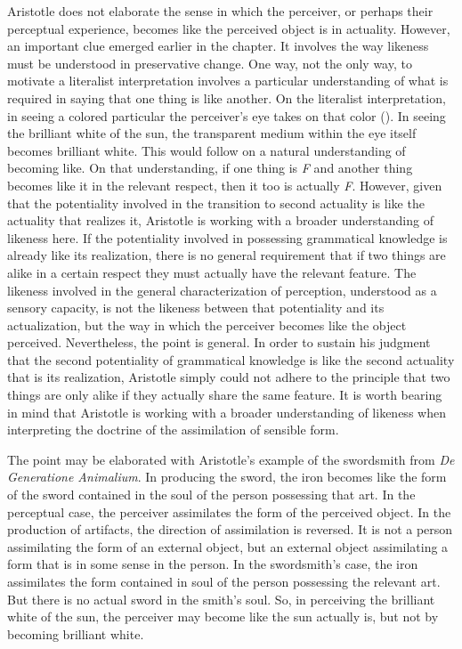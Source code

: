 Aristotle does not elaborate the sense in which the perceiver, or perhaps their perceptual experience, becomes like the perceived object is in actuality. However, an important clue emerged earlier in the chapter. It involves the way likeness must be understood in preservative change. One way, not the only way, to motivate a literalist interpretation involves a particular understanding of what is required in saying that one thing is like another. On the literalist interpretation, in seeing a colored particular the perceiver's eye takes on that color (\citealt{Slakey:1961ss,Sorabji:1974fk,Sorabji:2003fk,Everson:1997ep}). In seeing the brilliant white of the sun, the transparent medium within the eye itself becomes brilliant white. This would follow on a natural understanding of becoming like. On that understanding, if one thing is \emph{F} and another thing becomes like it in the relevant respect, then it too is actually \emph{F}. However, given that the potentiality involved in the transition to second actuality is like the actuality that realizes it, Aristotle is working with a broader understanding of likeness here. If the potentiality involved in possessing grammatical knowledge is already like its realization, there is no general requirement that if two things are alike in a certain respect they must actually have the relevant feature. The likeness involved in the general characterization of perception, understood as a sensory capacity, is not the likeness between that potentiality and its actualization, but the way in which the perceiver becomes like the object perceived. Nevertheless, the point is general. In order to sustain his judgment that the second potentiality of grammatical knowledge is like the second actuality that is its realization, Aristotle simply could not adhere to the principle that two things are only alike if they actually share the same feature. It is worth bearing in mind that Aristotle is working with a broader understanding of likeness when interpreting the doctrine of the assimilation of sensible form.

The point may be elaborated with Aristotle's example of the swordsmith from \emph{De Generatione Animalium}. In producing the sword, the iron becomes like the form of the sword contained in the soul of the person possessing that art. In the perceptual case, the perceiver assimilates the form of the perceived object. In the production of artifacts, the direction of assimilation is reversed. It is not a person assimilating the form of an external object, but an external object assimilating a form that is in some sense in the person. In the swordsmith's case, the iron assimilates the form contained in soul of the person possessing the relevant art. But there is no actual sword in the smith's soul. So, in perceiving the brilliant white of the sun, the perceiver may become like the sun actually is, but not by becoming brilliant white.

